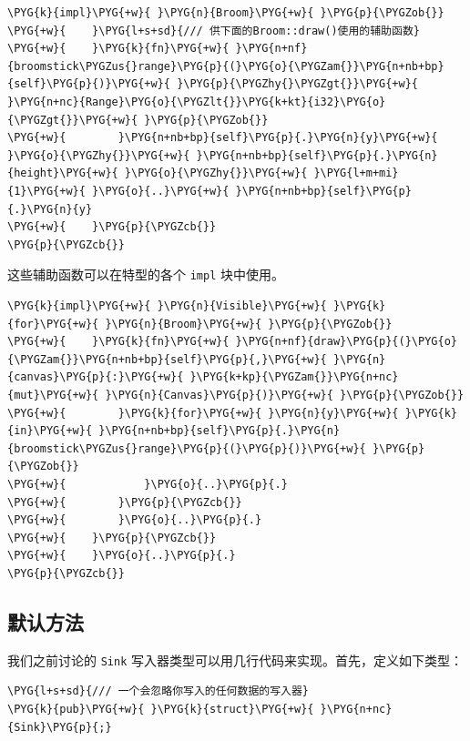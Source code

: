 \begin{Verbatim}[commandchars=\\\{\},breaklines=true,breakanywhere=true,fontsize=\codefont,xleftmargin=17bp]
\PYG{k}{impl}\PYG{+w}{ }\PYG{n}{Broom}\PYG{+w}{ }\PYG{p}{\PYGZob{}}
\PYG{+w}{    }\PYG{l+s+sd}{/// 供下面的Broom::draw()使用的辅助函数}
\PYG{+w}{    }\PYG{k}{fn}\PYG{+w}{ }\PYG{n+nf}{broomstick\PYGZus{}range}\PYG{p}{(}\PYG{o}{\PYGZam{}}\PYG{n+nb+bp}{self}\PYG{p}{)}\PYG{+w}{ }\PYG{p}{\PYGZhy{}\PYGZgt{}}\PYG{+w}{ }\PYG{n+nc}{Range}\PYG{o}{\PYGZlt{}}\PYG{k+kt}{i32}\PYG{o}{\PYGZgt{}}\PYG{+w}{ }\PYG{p}{\PYGZob{}}
\PYG{+w}{        }\PYG{n+nb+bp}{self}\PYG{p}{.}\PYG{n}{y}\PYG{+w}{ }\PYG{o}{\PYGZhy{}}\PYG{+w}{ }\PYG{n+nb+bp}{self}\PYG{p}{.}\PYG{n}{height}\PYG{+w}{ }\PYG{o}{\PYGZhy{}}\PYG{+w}{ }\PYG{l+m+mi}{1}\PYG{+w}{ }\PYG{o}{..}\PYG{+w}{ }\PYG{n+nb+bp}{self}\PYG{p}{.}\PYG{n}{y}
\PYG{+w}{    }\PYG{p}{\PYGZcb{}}
\PYG{p}{\PYGZcb{}}
\end{Verbatim}

这些辅助函数可以在特型的各个 \texttt{impl} 块中使用。

\begin{Verbatim}[commandchars=\\\{\},breaklines=true,breakanywhere=true,fontsize=\codefont,xleftmargin=17bp]
\PYG{k}{impl}\PYG{+w}{ }\PYG{n}{Visible}\PYG{+w}{ }\PYG{k}{for}\PYG{+w}{ }\PYG{n}{Broom}\PYG{+w}{ }\PYG{p}{\PYGZob{}}
\PYG{+w}{    }\PYG{k}{fn}\PYG{+w}{ }\PYG{n+nf}{draw}\PYG{p}{(}\PYG{o}{\PYGZam{}}\PYG{n+nb+bp}{self}\PYG{p}{,}\PYG{+w}{ }\PYG{n}{canvas}\PYG{p}{:}\PYG{+w}{ }\PYG{k+kp}{\PYGZam{}}\PYG{n+nc}{mut}\PYG{+w}{ }\PYG{n}{Canvas}\PYG{p}{)}\PYG{+w}{ }\PYG{p}{\PYGZob{}}
\PYG{+w}{        }\PYG{k}{for}\PYG{+w}{ }\PYG{n}{y}\PYG{+w}{ }\PYG{k}{in}\PYG{+w}{ }\PYG{n+nb+bp}{self}\PYG{p}{.}\PYG{n}{broomstick\PYGZus{}range}\PYG{p}{(}\PYG{p}{)}\PYG{+w}{ }\PYG{p}{\PYGZob{}}
\PYG{+w}{            }\PYG{o}{..}\PYG{p}{.}
\PYG{+w}{        }\PYG{p}{\PYGZcb{}}
\PYG{+w}{        }\PYG{o}{..}\PYG{p}{.}
\PYG{+w}{    }\PYG{p}{\PYGZcb{}}
\PYG{+w}{    }\PYG{o}{..}\PYG{p}{.}
\PYG{p}{\PYGZcb{}}
\end{Verbatim}

\subsection{默认方法}

我们之前讨论的 \texttt{Sink} 写入器类型可以用几行代码来实现。首先，定义如下类型：

\begin{Verbatim}[commandchars=\\\{\},breaklines=true,breakanywhere=true,fontsize=\codefont,xleftmargin=17bp]
\PYG{l+s+sd}{/// 一个会忽略你写入的任何数据的写入器}
\PYG{k}{pub}\PYG{+w}{ }\PYG{k}{struct}\PYG{+w}{ }\PYG{n+nc}{Sink}\PYG{p}{;}
\end{Verbatim}

